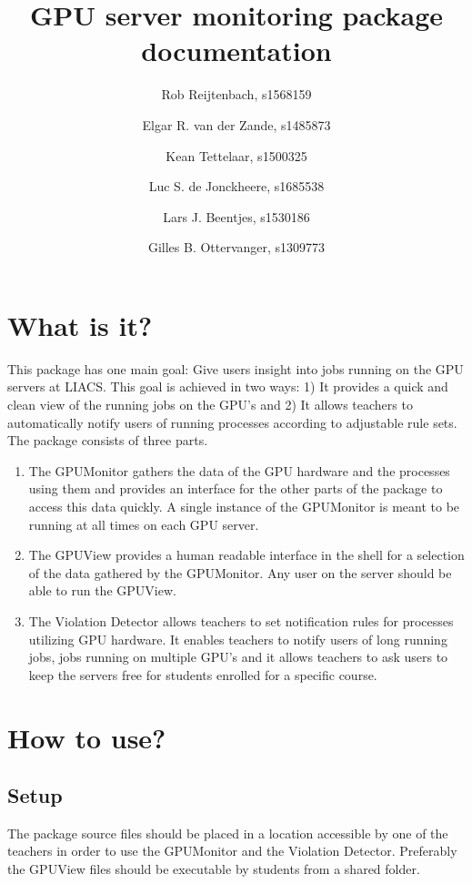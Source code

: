 \documentclass[10pt]{article}
\title{GPU server monitoring package documentation}
\author{
Rob Reijtenbach, s1568159 \and 
Elgar R. van der Zande, s1485873 \and
Kean Tettelaar, s1500325 \and 
Luc S. de Jonckheere, s1685538 \and 
Lars J. Beentjes, s1530186 \and 
Gilles B. Ottervanger, s1309773
}
\begin{document}

\maketitle

\section{What is it?}

This package has one main goal: Give users insight into jobs running 
on the GPU servers at LIACS. This goal is achieved in two ways: 1) 
It provides a quick and clean view of the running jobs on the GPU's
and 2) It allows teachers to automatically notify users of running
processes according to adjustable rule sets.\\

The package consists of three parts.
\begin{enumerate}
\item{} The GPUMonitor gathers the data of the GPU hardware and the processes 
using them and provides an interface for the other parts of the package 
to access this data quickly. A single instance of the GPUMonitor is 
meant to be running at all times on each GPU server.\\

\item{} The GPUView provides a human readable interface in the shell for a 
selection of the data gathered by the GPUMonitor. Any user on the server
should be able to run the GPUView.\\

\item{} The Violation Detector allows teachers to set notification rules for
processes utilizing GPU hardware. It enables teachers to notify users
of long running jobs, jobs running on multiple GPU's and it allows 
teachers to ask users to keep the servers free for students enrolled
for a specific course.
\end{enumerate}

\section{How to use?}
\subsection{Setup}
The package source files should be placed in a location accessible 
by one of the teachers in order to use the GPUMonitor and the 
Violation Detector. Preferably the GPUView files should be executable
by students from a shared folder.
\end{document}
